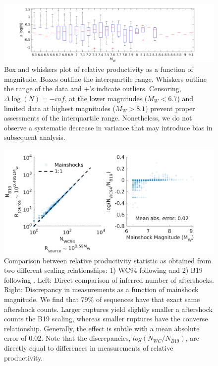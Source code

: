 \documentclass[draft]{agujournal}
\begin{document}
\begin{figure}[H]
\centering
\includegraphics[width=\textwidth]{figures/box_and_wiskers.png}
\caption{Box and whiskers plot of relative productivity as a function of magnitude. Boxes outline the interquartile range. Whiskers outline the range of the data and +'s indicate outliers. Censoring, $\Delta\log(N) = -inf$, at the lower magnitudes ($M_W<6.7$) and limited data at highest magnitudes ($M_W>8.1$) prevent proper assessments of the interquartile range. Nonetheless, we do not observe a systematic decrease in variance that may introduce bias in subsequent analysis.}
\label{fig:box_and_wiskers}
\end{figure}

\begin{figure}[H]
\centering
\includegraphics{figures/scaling_comparison.png}
\caption{Comparison between relative productivity statistic as obtained from two different scaling relationships: 1) WC94 following \citep{Wells1994} and 2) B19 following \citep{Brengman2019EarthquakeScalingDistributions}. Left: Direct comparison of inferred number of aftershocks. Right: Discrepancy in measurements as a function of mainshock magnitude. We find that 79\% of sequences have that exact same aftershock counts. Larger ruptures yield slightly smaller a aftershock counts the B19 scaling, whereas smaller ruptures have the converse relationship. Generally, the effect is subtle with a mean absolute error of 0.02. Note that the discrepancies, $log(N_{WC}/N_{B19})$, are directly equal to differences in measurements of relative productivity.}
\label{fig:prod_scaling}
\end{figure}
\end{document}
